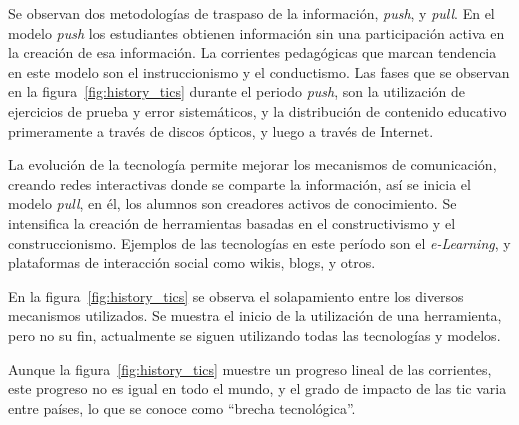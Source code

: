 
Se observan dos metodologías de traspaso de la información, \textit{push}, y
\textit{pull}. En el modelo \textit{push} los estudiantes obtienen información
sin una participación activa en la creación de esa información\cite{white:ict}.
La corrientes pedagógicas que marcan tendencia en este modelo son el
instruccionismo y el conductismo\cite{white:ict,leinonen:ict}. Las fases que se
observan en la figura~\ref{fig:history_tics} durante el periodo \textit{push},
son la utilización de ejercicios de prueba y error sistemáticos, y la
distribución de contenido educativo primeramente a través de discos ópticos, y
luego a través de Internet\cite{leinonen:ict}.

La evolución de la tecnología permite mejorar los mecanismos de comunicación,
creando redes interactivas donde se comparte la información, así se inicia el
modelo \textit{pull}, en él, los alumnos son creadores activos de
conocimiento\cite{white:ict,leinonen:ict}. Se intensifica la creación de
herramientas basadas en el constructivismo y el construccionismo. Ejemplos de
las tecnologías en este período son el \textit{e-Learning}, y plataformas de
interacción social como wikis, blogs, y otros\cite{leinonen:ict}.

En la figura~\ref{fig:history_tics} se observa el solapamiento entre los
diversos mecanismos utilizados. Se muestra el inicio de la utilización de una
herramienta, pero no su fin, actualmente se siguen utilizando todas las
tecnologías y modelos\cite{leinonen:ict}.

Aunque la figura~\ref{fig:history_tics} muestre un progreso lineal de las
corrientes, este progreso no es igual en todo el mundo, y el grado de impacto de
las \Gls{tic} varia entre países, lo que se conoce como \enquote{brecha
    tecnológica}.

